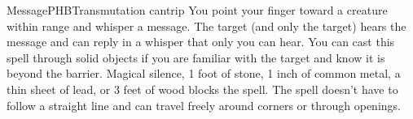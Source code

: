 \begin{spell}{Message}{PHB}{Transmutation cantrip}
{
}
You point your finger toward a creature within range and
whisper a message. The target (and only the target) hears
the message and can reply in a whisper that only you can
hear. You can cast this spell through solid objects if you
are familiar with the target and know it is beyond the
barrier. Magical silence, 1 foot of stone, 1 inch of common
metal, a thin sheet of lead, or 3 feet of wood blocks the
spell. The spell doesn't have to follow a straight line and
can travel freely around corners or through openings.
\end{spell}
